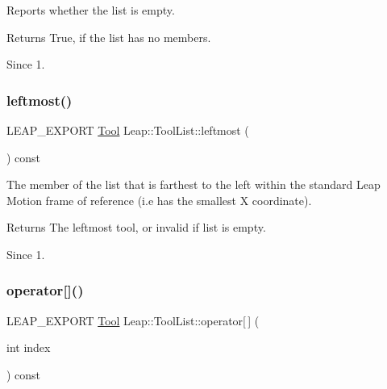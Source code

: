Reports whether the list is empty.


\begin{DoxyCodeInclude}
\end{DoxyCodeInclude}


\begin{DoxyReturn}{Returns}
True, if the list has no members. 
\end{DoxyReturn}
\begin{DoxySince}{Since}
1. 
\end{DoxySince}
\mbox{\label{class_leap_1_1_tool_list_a257dd0d735fe8f646bb5e38807cdb17b}} 
\subsubsection{\texorpdfstring{leftmost()}{leftmost()}}
{\footnotesize\ttfamily L\+E\+A\+P\+\_\+\+E\+X\+P\+O\+RT \hyperlink{class_leap_1_1_tool}{Tool} Leap\+::\+Tool\+List\+::leftmost (\begin{DoxyParamCaption}{ }\end{DoxyParamCaption}) const}

The member of the list that is farthest to the left within the standard Leap Motion frame of reference (i.\+e has the smallest X coordinate).


\begin{DoxyCodeInclude}
\end{DoxyCodeInclude}


\begin{DoxyReturn}{Returns}
The leftmost tool, or invalid if list is empty. 
\end{DoxyReturn}
\begin{DoxySince}{Since}
1. 
\end{DoxySince}
\mbox{\label{class_leap_1_1_tool_list_ae8b61cd22cda8f80155bddd5b9ba7d43}} 
\subsubsection{\texorpdfstring{operator[]()}{operator[]()}}
{\footnotesize\ttfamily L\+E\+A\+P\+\_\+\+E\+X\+P\+O\+RT \hyperlink{class_leap_1_1_tool}{Tool} Leap\+::\+Tool\+List\+::operator\mbox{[}$\,$\mbox{]} (\begin{DoxyParamCaption}\item[{int}]{index }\end{DoxyParamCaption}) const}


